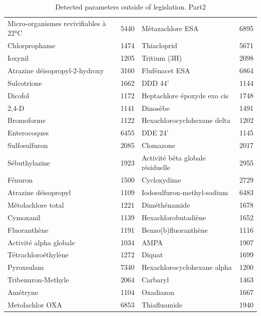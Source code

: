 \documentclass{article}
\begin{document}
\begin{table}[H]
{\begin{tabular}{|l|l||l|l|}
    Micro-organismes revivifiables à 22°C & 5440 & Métazachlore ESA & 6895 \\
    Chlorprophame & 1474 & Thiacloprid & 5671 \\
    Ioxynil & 1205 & Tritium (3H) & 2098 \\
    Atrazine déisopropyl-2-hydroxy & 3160 & Flufénacet ESA & 6864 \\
    Sulcotrione & 1662 & DDD 44' & 1144 \\
    Dicofol & 1172 & Heptachlore époxyde exo cis & 1748 \\
    2,4-D & 1141 & Dinosèbe & 1491 \\
    Bromoforme & 1122 & Hexachlorocyclohexane delta & 1202 \\
    Enterocoques & 6455 & DDE 24' & 1145 \\
    Sulfosulfuron & 2085 & Clomazone & 2017 \\
    Sébuthylazine & 1923 & Activité bêta globale résiduelle & 2955 \\
    Fénuron & 1500 & Cycloxydime & 2729 \\
    Atrazine déisopropyl & 1109 & Iodosulfuron-methyl-sodium & 6483 \\
    Métolachlore total & 1221 & Diméthénamide & 1678 \\
    Cymoxanil & 1139 & Hexachlorobutadiène & 1652 \\
    Fluoranthène & 1191 & Benzo(b)fluoranthène & 1116 \\
    Activité alpha globale & 1034 & AMPA & 1907 \\
    Tétrachloroéthylène & 1272 & Diquat & 1699 \\
    Pyroxsulam & 7340 & Hexachlorocyclohexane alpha & 1200 \\
    Tribenuron-Methyle & 2064 & Carbaryl & 1463 \\
    Amétryne & 1104 & Oxadiazon & 1667 \\
    Metolachlor OXA & 6853 & Thiafluamide & 1940 \\
        \hline
    \end{tabular}
}
\caption{Detected parameters outside of legislation. Part2}
\end{table}
\end{document}
